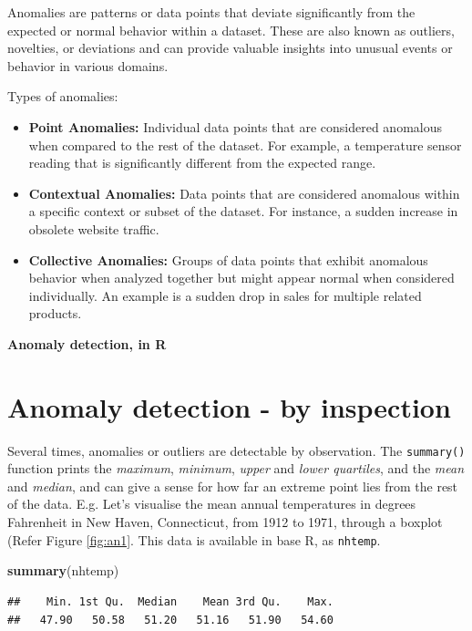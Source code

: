 \documentclass[
]{book}
\newenvironment{Shaded}{\begin{snugshade}}{\end{snugshade}}
\newcommand{\FunctionTok}[1]{\textcolor[rgb]{0.13,0.29,0.53}{\textbf{#1}}}
\newcommand{\NormalTok}[1]{#1}
\begin{document}
Anomalies are patterns or data points that deviate significantly from the expected or normal behavior within a dataset. These are also known as outliers, novelties, or deviations and can provide valuable insights into unusual events or behavior in various domains.

Types of anomalies:

\begin{itemize}
\item
  \textbf{Point Anomalies:} Individual data points that are considered anomalous when compared to the rest of the dataset. For example, a temperature sensor reading that is significantly different from the expected range.
\item
  \textbf{Contextual Anomalies:} Data points that are considered anomalous within a specific context or subset of the dataset. For instance, a sudden increase in obsolete website traffic.
\item
  \textbf{Collective Anomalies:} Groups of data points that exhibit anomalous behavior when analyzed together but might appear normal when considered individually. An example is a sudden drop in sales for multiple related products.
\end{itemize}

\textbf{Anomaly detection, in R}

\hypertarget{anomaly-detection---by-inspection}{%
\section{Anomaly detection - by inspection}\label{anomaly-detection---by-inspection}}

Several times, anomalies or outliers are detectable by observation. The \texttt{summary()} function prints the \emph{maximum}, \emph{minimum}, \emph{upper} and \emph{lower quartiles}, and the \emph{mean} and \emph{median}, and can give a sense for how far an extreme point lies from the rest of the data. E.g. Let's visualise the mean annual temperatures in degrees Fahrenheit in New Haven, Connecticut, from 1912 to 1971, through a boxplot (Refer Figure \ref{fig:an1}. This data is available in base R, as \texttt{nhtemp}.

\begin{Shaded}
\begin{Highlighting}[]
\FunctionTok{summary}\NormalTok{(nhtemp)}
\end{Highlighting}
\end{Shaded}

\begin{verbatim}
##    Min. 1st Qu.  Median    Mean 3rd Qu.    Max. 
##   47.90   50.58   51.20   51.16   51.90   54.60
\end{verbatim}
\end{document}
